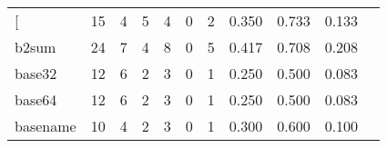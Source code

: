 \begin{longtable}{lp{1.2cm}p{1.2cm}p{1.2cm}p{1.2cm}p{1.2cm}p{1.2cm}p{1.2cm}p{1.2cm}p{1.2cm}p{1.2cm}}
\bottomrule
\endlastfoot
{[}         &                                    15 &                                                  4 &                                                  5 &                                                  4 &                                                  0 &                                                  2 &                                              0.350 &                                              0.733 &                                              0.133 \\
b2sum     &                                    24 &                                                  7 &                                                  4 &                                                  8 &                                                  0 &                                                  5 &                                              0.417 &                                              0.708 &                                              0.208 \\
base32    &                                    12 &                                                  6 &                                                  2 &                                                  3 &                                                  0 &                                                  1 &                                              0.250 &                                              0.500 &                                              0.083 \\
base64    &                                    12 &                                                  6 &                                                  2 &                                                  3 &                                                  0 &                                                  1 &                                              0.250 &                                              0.500 &                                              0.083 \\
basename  &                                    10 &                                                  4 &                                                  2 &                                                  3 &                                                  0 &                                                  1 &                                              0.300 &                                              0.600 &                                              0.100 \\

\end{longtable}
